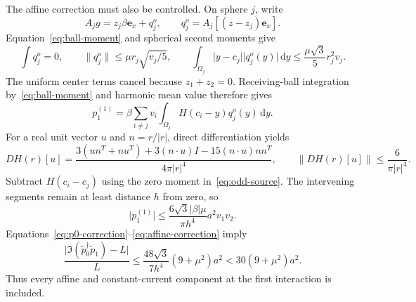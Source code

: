 \documentclass[11pt]{article}
\newcommand{\dd}{\,\mathrm{d}}
\newcommand{\norm}[1]{\lVert #1\rVert}
\newcommand{\abs}[1]{\lvert #1\rvert}
\newcommand{\ex}{\mathbf e_x}
\begin{document}
The affine correction must also be controlled. On sphere $j$, write
\[
 A_jg=z_j\beta\ex+q_j^o,\qquad
 q_j^o=A_j[(z-z_j)\ex].
\]
Equation~\eqref{eq:ball-moment} and spherical second moments give
\begin{equation}\label{eq:odd-source}
 \int q_j^o=0,\qquad \norm{q_j^o}\leq\mu r_j\sqrt{v_j/5},
 \qquad\int_{\Omega_j}\abs{y-c_j}\abs{q_j^o(y)}\dd y
 \leq\frac{\mu\sqrt3}{5}r_j^2v_j.
\end{equation}
The uniform center terms cancel because $z_1+z_2=0$. Receiving-ball integration by~\eqref{eq:ball-moment} and harmonic mean value therefore gives
\[
 p_1^{(1)}=\beta\sum_{i\ne j}v_i
       \int_{\Omega_j}H(c_i-y)q_j^o(y)\dd y.
\]
For a real unit vector $u$ and $n=r/\abs r$, direct differentiation yields
\begin{equation}\label{eq:derivative}
 DH(r)[u]=\frac{3(un^T+nu^T)+3(n\cdot u)I-15(n\cdot u)nn^T}
 {4\pi\abs r^4},\qquad
 \norm{DH(r)[u]}\leq\frac6{\pi\abs r^4}.
\end{equation}
Subtract $H(c_i-c_j)$ using the zero moment in~\eqref{eq:odd-source}. The intervening segments remain at least distance $h$ from zero, so
\begin{equation}\label{eq:affine-correction}
 \abs{p_1^{(1)}}\leq\frac{6\sqrt3\abs\beta\mu}{\pi h^4}
             a^2v_1v_2.
\end{equation}
Equations~\eqref{eq:p0-correction}--\eqref{eq:affine-correction} imply
\begin{equation}\label{eq:first-error}
 \frac{\abs{\Im(\widetilde p_0^\dagger\widetilde p_1)-L}}{L}
 \leq\frac{48\sqrt3}{7h^4}(9+\mu^2)a^2
 <30(9+\mu^2)a^2.
\end{equation}
Thus every affine and constant-current component at the first interaction is included.
\end{document}
